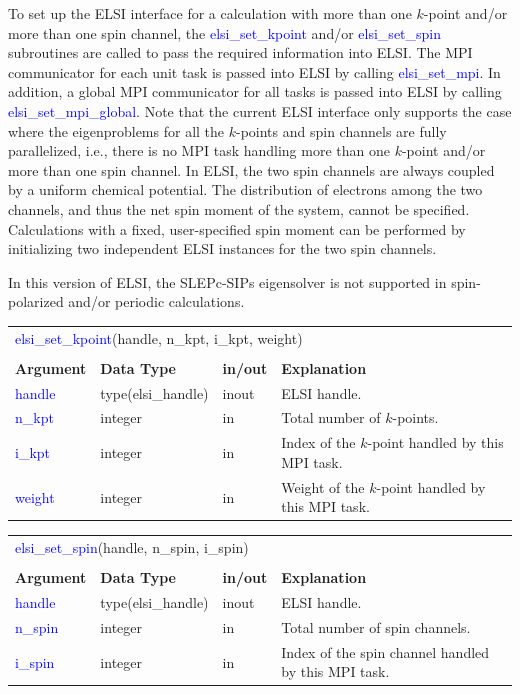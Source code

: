 \documentclass{report}
\newcommand{\tcb}[1]{\textcolor{blue}{#1}}
\begin{document}
To set up the ELSI interface for a calculation with more than one $k$-point and/or more than one spin channel, the \tcb{elsi\_set\_kpoint} and/or \tcb{elsi\_set\_spin} subroutines are called to pass the required information into ELSI. The MPI communicator for each unit task is passed into ELSI by calling \tcb{elsi\_set\_mpi}. In addition, a global MPI communicator for all tasks is passed into ELSI by calling \tcb{elsi\_set\_mpi\_global}. Note that the current ELSI interface only supports the case where the eigenproblems for all the $k$-points and spin channels are fully parallelized, i.e., there is no MPI task handling more than one $k$-point and/or more than one spin channel. In ELSI, the two spin channels are always coupled by a uniform chemical potential. The distribution of electrons among the two channels, and thus the net spin moment of the system, cannot be specified. Calculations with a fixed, user-specified spin moment can be performed by initializing two independent ELSI instances for the two spin channels.

In this version of ELSI, the SLEPc-SIPs eigensolver is not supported in spin-polarized and/or periodic calculations.

\begin{tabular}[]{|p{30mm}|p{30mm}|p{15mm}|p{90mm}|}
\multicolumn{4}{l}{\tcb{elsi\_set\_kpoint}(handle, n\_kpt, i\_kpt, weight)}\\
\multicolumn{4}{l}{}\\
\hline
\multicolumn{1}{|l|}{\textbf{Argument}} & \multicolumn{1}{l|}{\textbf{Data Type}} & \multicolumn{1}{l|}{\textbf{in/out}} & \multicolumn{1}{l|}{\textbf{Explanation}}\\
\hline
\tcb{handle} & type(elsi\_handle) & inout & ELSI handle.\\
\hline
\tcb{n\_kpt} & integer            & in    & Total number of $k$-points.\\
\hline
\tcb{i\_kpt} & integer            & in    & Index of the $k$-point handled by this MPI task.\\
\hline
\tcb{weight} & integer            & in    & Weight of the $k$-point handled by this MPI task.\\
\hline
\end{tabular}

\begin{tabular}[]{|p{30mm}|p{30mm}|p{15mm}|p{90mm}|}
\multicolumn{4}{l}{\tcb{elsi\_set\_spin}(handle, n\_spin, i\_spin)}\\
\multicolumn{4}{l}{}\\
\hline
\multicolumn{1}{|l|}{\textbf{Argument}} & \multicolumn{1}{l|}{\textbf{Data Type}} & \multicolumn{1}{l|}{\textbf{in/out}} & \multicolumn{1}{l|}{\textbf{Explanation}}\\
\hline
\tcb{handle}  & type(elsi\_handle) & inout & ELSI handle.\\
\hline
\tcb{n\_spin} & integer            & in    & Total number of spin channels.\\
\hline
\tcb{i\_spin} & integer            & in    & Index of the spin channel handled by this MPI task.\\
\hline
\end{tabular}
\end{document}
